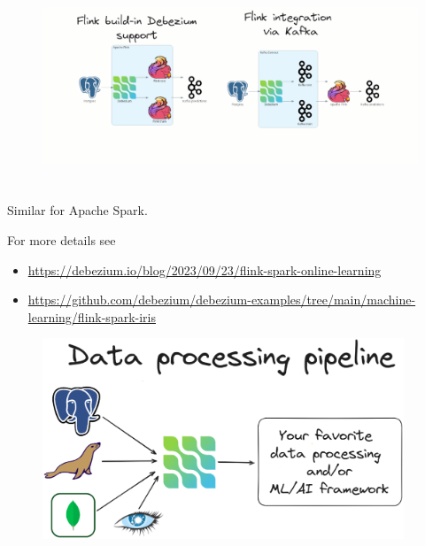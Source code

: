 \documentclass[10pt,utf8]{beamer}
\begin{document}
\begin{frame}
    \begin{figure}
        \hspace*{-1.1cm}
        \includegraphics[height=6cm]{./img/debezium_flink.eps}
    \end{figure}
    
    \vspace{-1cm}
    Similar for Apache Spark.
    \vspace{0.5cm}
    
    For more details see
    \begin{itemize}
        \item  \footnotesize \color{blue}\url{https://debezium.io/blog/2023/09/23/flink-spark-online-learning}
        \item  \footnotesize \url{https://github.com/debezium/debezium-examples/tree/main/machine-learning/flink-spark-iris}\color{black}
    \end{itemize}
\end{frame}


\begin{frame}
    \begin{figure}
        \centering
        \includegraphics[height=6cm]{./img/dbs_to_ml.eps}
    \end{figure}
\end{frame}
\end{document}
